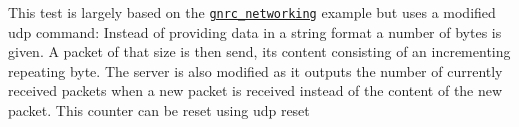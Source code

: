 This test is largely based on the \href{https://github.com/RIOT-OS/RIOT/tree/master/examples/gnrc_networking}{\tt {\ttfamily gnrc\+\_\+networking}} example but uses a modified {\ttfamily udp} command\+: Instead of providing data in a string format a number of bytes is given. A packet of that size is then send, its content consisting of an incrementing repeating byte. The server is also modified as it outputs the number of currently received packets when a new packet is received instead of the content of the new packet. This counter can be reset using {\ttfamily udp reset} 